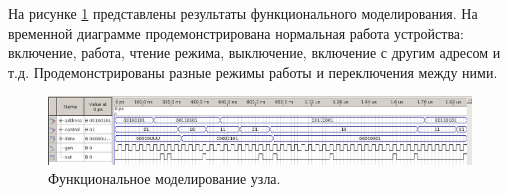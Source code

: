 На рисунке \ref{fig:funcmodel} представлены результаты функционального моделирования. На временной диаграмме продемонстрирована нормальная работа устройства: включение, работа, чтение режима, выключение, включение с другим адресом и т.д. Продемонстрированы разные режимы работы и переключения между ними.
\begin{figure}
  \includegraphics[scale=0.5]{./func-switching.png}
  \caption{Функциональное моделирование узла.}
  \label{fig:funcmodel}
\end{figure}